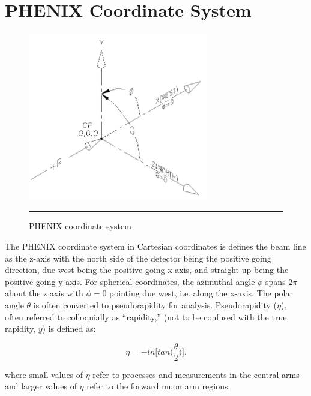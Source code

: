 \appendix
\chapter{PHENIX Coordinate System} %

\begin{figure}[htbp!]
  \centering
    \includegraphics[width=0.7\textwidth]{Figures/coord2.jpg}
    \rule{35em}{0.5pt}
  \caption[PHENIX coordinate system]{PHENIX coordinate system}
  \label{fig:PHENIXcoord}
\end{figure}

The PHENIX coordinate system in Cartesian coordinates is defines the beam line as the z-axis with the north side of the detector being the positive going direction, due west being the positive going x-axis, and straight up being the positive going y-axis. For spherical coordinates, the azimuthal angle $\phi$ spans $2\pi$ about the z axis with $\phi=0$ pointing due west, i.e. along the x-axis. The polar angle $\theta$ is often converted to pseudorapidity for analysis. Pseudorapidity ($\eta$), often referred to colloquially as ``rapidity,'' (not to be confused with the true rapidity, $y$) is defined as:

\begin{equation}
\eta = - ln \bigg[ tan \bigg( \frac{\theta}{2} \bigg) \bigg].
\end{equation}

where small values of $\eta$ refer to processes and measurements in the central arms and larger values of $\eta$ refer to the forward muon arm regions.

